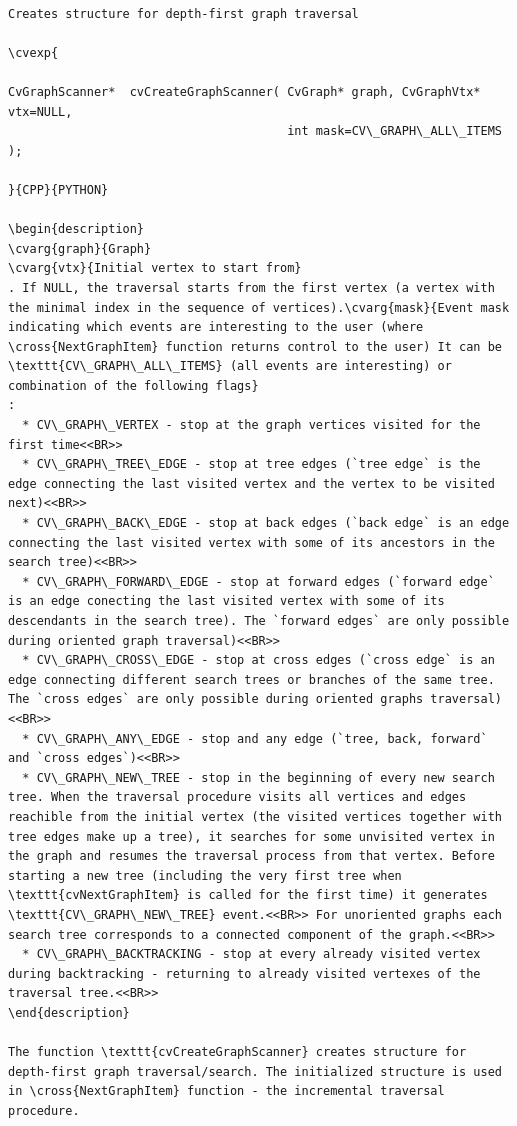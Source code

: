 \label{CreateGraphScanner}
\begin{verbatim}

Creates structure for depth-first graph traversal

\cvexp{

CvGraphScanner*  cvCreateGraphScanner( CvGraph* graph, CvGraphVtx* vtx=NULL,
                                       int mask=CV\_GRAPH\_ALL\_ITEMS );

}{CPP}{PYTHON}

\begin{description}
\cvarg{graph}{Graph}
\cvarg{vtx}{Initial vertex to start from}
. If NULL, the traversal starts from the first vertex (a vertex with the minimal index in the sequence of vertices).\cvarg{mask}{Event mask indicating which events are interesting to the user (where \cross{NextGraphItem} function returns control to the user) It can be \texttt{CV\_GRAPH\_ALL\_ITEMS} (all events are interesting) or combination of the following flags}
:
  * CV\_GRAPH\_VERTEX - stop at the graph vertices visited for the first time<<BR>>
  * CV\_GRAPH\_TREE\_EDGE - stop at tree edges (`tree edge` is the edge connecting the last visited vertex and the vertex to be visited next)<<BR>>
  * CV\_GRAPH\_BACK\_EDGE - stop at back edges (`back edge` is an edge connecting the last visited vertex with some of its ancestors in the search tree)<<BR>>
  * CV\_GRAPH\_FORWARD\_EDGE - stop at forward edges (`forward edge` is an edge conecting the last visited vertex with some of its descendants in the search tree). The `forward edges` are only possible during oriented graph traversal)<<BR>>
  * CV\_GRAPH\_CROSS\_EDGE - stop at cross edges (`cross edge` is an edge connecting different search trees or branches of the same tree. The `cross edges` are only possible during oriented graphs traversal)<<BR>>
  * CV\_GRAPH\_ANY\_EDGE - stop and any edge (`tree, back, forward` and `cross edges`)<<BR>>
  * CV\_GRAPH\_NEW\_TREE - stop in the beginning of every new search tree. When the traversal procedure visits all vertices and edges reachible from the initial vertex (the visited vertices together with tree edges make up a tree), it searches for some unvisited vertex in the graph and resumes the traversal process from that vertex. Before starting a new tree (including the very first tree when \texttt{cvNextGraphItem} is called for the first time) it generates \texttt{CV\_GRAPH\_NEW\_TREE} event.<<BR>> For unoriented graphs each search tree corresponds to a connected component of the graph.<<BR>>
  * CV\_GRAPH\_BACKTRACKING - stop at every already visited vertex during backtracking - returning to already visited vertexes of the traversal tree.<<BR>>
\end{description}

The function \texttt{cvCreateGraphScanner} creates structure for depth-first graph traversal/search. The initialized structure is used in \cross{NextGraphItem} function - the incremental traversal procedure.


\end{verbatim}
